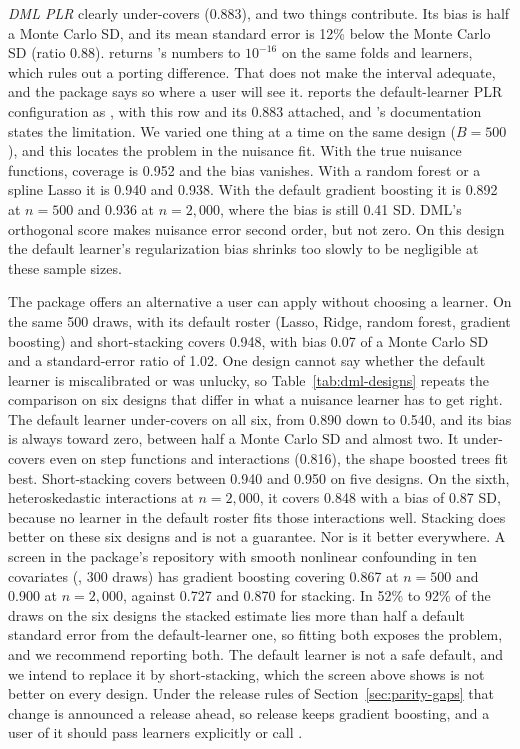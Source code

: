 \emph{DML PLR} clearly under-covers (0.883), and two things contribute.
Its bias is half a Monte Carlo SD, and its mean standard error is 12\%
below the Monte Carlo SD (ratio 0.88).  returns
's numbers to \(10^{-16}\) on the same folds and learners,
which rules out a porting difference. That does not make the interval
adequate, and the package says so where a user will see it.
 reports the default-learner PLR
configuration as , with this row and its 0.883
attached, and 's documentation states the limitation. We
varied one thing at a time on the same design
(\(B=500\)), and this locates the problem in the nuisance fit. With the
true nuisance functions, coverage is 0.952 and the bias vanishes. With a
random forest or a spline Lasso it is 0.940 and 0.938. With the default
gradient boosting it is 0.892 at \(n=500\) and 0.936 at \(n=2{,}000\),
where the bias is still 0.41 SD. DML's orthogonal score makes nuisance
error second order, but not zero. On this design the default learner's
regularization bias shrinks too slowly to be negligible at these sample
sizes.

The package offers an alternative a user can apply without choosing a
learner. On the same 500 draws,  with its
default roster (Lasso, Ridge, random forest, gradient boosting) and
short-stacking \citep{ahrens2025model} covers 0.948, with bias 0.07 of a
Monte Carlo SD and a standard-error ratio of 1.02.
One design cannot say whether the default learner is miscalibrated or was
unlucky, so Table~\ref{tab:dml-designs} repeats the comparison on six designs
that differ in what a nuisance learner has to get right. The default learner
under-covers on all six, from 0.890 down to 0.540, and its bias is always
toward zero, between half a Monte Carlo SD and almost two. It under-covers
even on step functions and interactions (0.816), the shape boosted trees fit
best. Short-stacking covers between 0.940 and 0.950 on five designs. On the
sixth, heteroskedastic interactions at \(n=2{,}000\), it covers 0.848 with a bias of
0.87 SD, because no learner in the default roster fits those interactions
well. Stacking does better on these six designs and is not a guarantee. Nor
is it better everywhere. A screen in the package's repository with smooth
nonlinear confounding in ten covariates
(, 300 draws) has gradient boosting
covering 0.867 at \(n=500\) and 0.900 at \(n=2{,}000\), against 0.727 and
0.870 for stacking. In 52\%
to 92\% of the draws on the six designs the stacked estimate lies more than
half a default standard error from the default-learner one, so fitting both
exposes the problem, and we recommend reporting both. The default learner is
not a safe default, and we intend to replace it by short-stacking, which
the screen above shows is not better on every design. Under the release rules of
Section~\ref{sec:parity-gaps} that change is announced a release ahead, so
release \StatsPAIVersion{} keeps gradient boosting, and a user of it should
pass learners explicitly or call .

